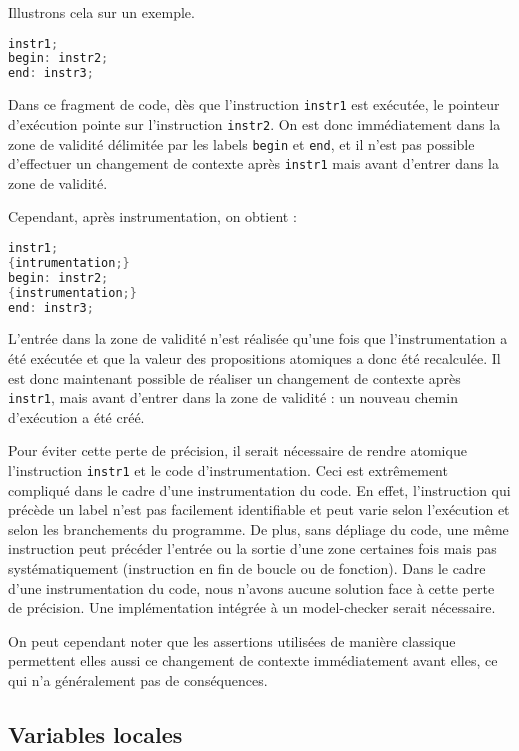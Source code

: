Illustrons cela sur un exemple.

\begin{lstlisting}[language=C]
instr1;
begin: instr2;
end: instr3;
\end{lstlisting}

Dans ce fragment de code, dès que l'instruction \texttt{instr1} est
exécutée, le pointeur d'exécution pointe sur l'instruction
\texttt{instr2}. On est donc immédiatement dans la zone de validité
délimitée par les labels \texttt{begin} et \texttt{end}, et il
n'est pas possible d'effectuer un changement de contexte après
\texttt{instr1} mais avant d'entrer dans la zone de validité.

Cependant, après instrumentation, on obtient :

\begin{lstlisting}[language=C]
instr1;
{intrumentation;}
begin: instr2;
{instrumentation;}
end: instr3;
\end{lstlisting}

L'entrée dans la zone de validité n'est réalisée qu'une fois que
l'instrumentation a été exécutée et que la valeur des propositions
atomiques a donc été recalculée. Il est donc maintenant possible de
réaliser un changement de contexte après \texttt{instr1}, mais avant
d'entrer dans la zone de validité : un nouveau chemin d'exécution a été
créé.

Pour éviter cette perte de précision, il serait nécessaire de rendre
atomique l'instruction \texttt{instr1} et le code d'instrumentation.
Ceci est extrêmement compliqué dans le cadre d'une instrumentation du
code. En effet, l'instruction qui précède un label n'est pas facilement
identifiable et peut varie selon l'exécution et selon les branchements
du programme. De plus, sans dépliage du code, une même instruction peut
précéder l'entrée ou la sortie d'une zone certaines fois mais pas
systématiquement (instruction en fin de boucle ou de fonction). Dans le
cadre d'une instrumentation du code, nous n'avons aucune solution face à
cette perte de précision. Une implémentation intégrée à un model-checker
serait nécessaire.

On peut cependant noter que les assertions utilisées de manière
classique permettent elles aussi ce changement de contexte immédiatement
avant elles, ce qui n'a généralement pas de conséquences.

\subsection{Variables locales}

